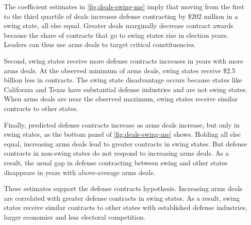 \documentclass[12pt]{article}
\begin{document}
The coefficient estimates in \autoref{fig:deals-swing-me} imply that moving from the first to the third quartile of deals increases defense contracting by \$202 million in a swing state, all else equal. 
Greater deals marginally decrease contract awards because the share of contracts that go to swing states rise in election years. 
Leaders can thus use arms deals to target critical constituencies.


Second, swing states receive more defense contracts increases in years with more arms deals. 
At the observed minimum of arms deals, swing states receive \$2.5 billion less in contracts.
The swing state disadvantage occurs because states like California and Texas have substantial defense industries and are not swing states.
When arms deals are near the observed maximum, swing states receive similar contracts to other states. 


Finally, predicted defense contracts increase as arms deals increase, but only in swing states, as the bottom panel of \autoref{fig:deals-swing-me} shows. 
Holding all else equal, increasing arms deals lead to greater contracts in swing states. 
But defense contracts in non-swing states do not respond to increasing arms deals.
As a result, the usual gap in defense contracting between swing and other states disappears in years with above-average arms deals. 



These estimates support the defense contracts hypothesis. 
Increasing arms deals are correlated with greater defense contracts in swing states. 
As a result, swing states receive similar contracts to other states with established defense industries, larger economies and less electoral competition. 
%
%
%
%
\end{document}
